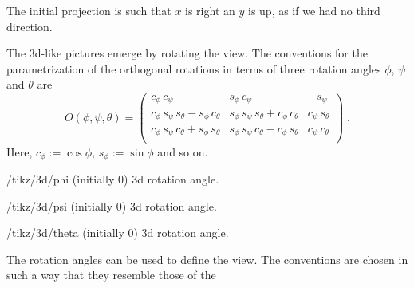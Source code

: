 \documentclass[a4paper,fleqn]{ltxdoc}
\begin{document}
The initial projection is such that $x$ is right an $y$ is up, as if we had no
third direction.

\begin{codeexample}[width=2cm]
\end{codeexample}



The 3d-like pictures emerge by rotating the view. The conventions for the
parametrization of the orthogonal rotations in terms of three rotation angles
$\phi$, $\psi$ and $\theta$ are
\begin{equation}
 O(\phi,\psi,\theta)=\begin{pmatrix}
 c_{\phi}\,c_{\psi} & s_{\phi}\,c_{\psi} & -s_{\psi} \\
 c_{\phi}\,s_{\psi}\,s_{\theta}-s_{\phi}\,c_{\theta} & 
 s_{\phi}\,s_{\psi}\,s_{\theta}+c_{\phi}\,c_{\theta} 
 & c_{\psi}\,s_{\theta} \\
 c_{\phi}\,s_{\psi}\,c_{\theta}+s_{\phi}\,s_{\theta} 
 & s_{\phi}\,s_{\psi}\,c_{\theta}-c_{\phi}\,s_{\theta} & c_{\psi}\,c_{\theta} \\
\end{pmatrix}\;.\label{eq:O3}
\end{equation}
Here, $c_\phi:=\cos\phi$, $s_\phi:=\sin\phi$ and so on.
\begin{key}{/tikz/3d/phi (initially 0)}
        3d rotation angle.
\end{key}
\begin{key}{/tikz/3d/psi (initially 0)}
        3d rotation angle.
\end{key}
\begin{key}{/tikz/3d/theta (initially 0)}
        3d rotation angle.
\end{key}
The rotation angles can be used to define the view. The conventions are chosen
in such a way that they resemble those of the
\end{document}
